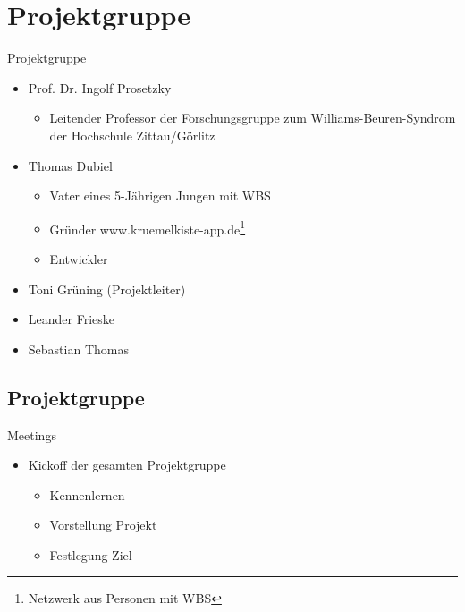 \documentclass[10pt,fleqn]{beamer}
\begin{document}
\section{Projektgruppe}
	\begin{frame}[t]{Projektgruppe}
		\begin{itemize}
			\item Prof. Dr. Ingolf Prosetzky
			\begin{itemize}
				\item Leitender Professor der Forschungsgruppe zum Williams-Beuren-Syndrom der Hochschule Zittau/Görlitz
			\end{itemize}
			\item Thomas Dubiel
			\begin{itemize}
				\item Vater eines 5-Jährigen Jungen mit WBS
				\item Gründer www.kruemelkiste-app.de\footnote{Netzwerk aus Personen mit WBS}
				\item Entwickler
			\end{itemize}
			\item Toni Grüning (Projektleiter)
			\item Leander Frieske
			\item Sebastian Thomas
		\end{itemize}
	\end{frame}

\subsection{Projektgruppe}
\begin{frame}[t]{Meetings}
\begin{itemize}
	\item Kickoff der gesamten Projektgruppe
	\begin{itemize}
		\item Kennenlernen
		\item Vorstellung Projekt
		\item Festlegung Ziel
	\end{itemize}
\end{itemize}
\end{frame}
\end{document}
